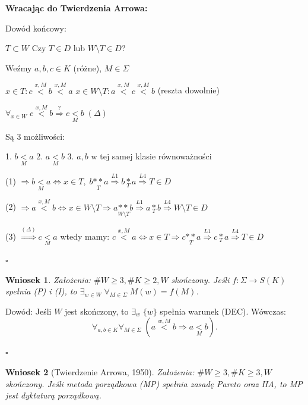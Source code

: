 \documentclass[12pt,a4paper]{article}
\theoremstyle{break}
\newtheorem{wniosek}{Wniosek}[theorem]
\begin{document}
	\textbf{Wracając do Twierdzenia Arrowa:}  
	
	Dowód końcowy:  
	
	$T\subset W$ Czy $T \in D$ lub $W\setminus T \in D$?  
	
	Weźmy $a,b,c\in K$ (różne), $M\in \Sigma$  
	
	$x \in T : c\overset{x,M}{<}b\overset{x,M}{<}a$  
	$x\in W\setminus T : a\overset{x,M}{<}c\overset{x,M}{<}b$ (reszta dowolnie)  
	
	$\forall_{x\in W} \; c\overset{x,M}{<}b \overset{?}{\Rightarrow} c \underset{M}{<}b \; (\Delta)$  
	
	Są 3 możliwości:  
	
	1. $b\underset{M}{<}a$  
	2. $a\underset{M}{<}b$  
	3. $a,b$ w tej samej klasie równoważności  
	
	(1) $\Rightarrow b\underset{M}{<}a \Leftrightarrow x\in T, \; b\underset{T}{**}a \overset{L1}{\Rightarrow} b\underset{T}{*}a \overset{L4}{\Rightarrow} T\in D$  
	
	(2) $\Rightarrow a\overset{x,M}{<}b \Leftrightarrow x\in W\setminus T \Rightarrow a\underset{W\setminus T}{**}b \overset{L1}{\Rightarrow} a\underset{T}{*}b \overset{L4}{\Rightarrow} W\setminus T \in D$  
	
	(3) $\overset{(\Delta)}{\Rightarrow} c\underset{M}{<}a$ wtedy mamy:  
	$c\overset{x,M}{<}a \Leftrightarrow x\in T \Rightarrow c\underset{T}{**}a \overset{L1}{\Rightarrow} c\underset{T}{*}a \overset{L4}{\Rightarrow} T\in D$  
	
	\begin{flushright}
		$\square$
	\end{flushright}
	
	\begin{wniosek}
		Założenia: $\# W \geq 3, \# K \geq 2, W$ skończony.  
		Jeśli $f : \Sigma \to S(K)$ spełnia (P) i (I), to $\exists_{w \in W} \; \forall_{M \in \Sigma} \; M(w) = f(M)$.
	\end{wniosek}
	
	Dowód: Jeśli $W$ jest skończony, to $\exists_w \; \{w\}$ spełnia warunek (DEC).  
	Wówczas:
	\[
	\forall_{a, b \in K} \forall_{M \in \Sigma} \; (a \overset{w, M}{<} b \Rightarrow a \underset{M}{<} b).
	\]
	\begin{flushright}
		$\square$
	\end{flushright}
	
	\begin{wniosek}[Twierdzenie Arrowa, 1950]
		Założenia: $\# W \geq 3, \# K \geq 3, W$ skończony.  
		Jeśli metoda porządkowa (MP) spełnia zasadę Pareto oraz IIA, to MP jest dyktaturą porządkową.
	\end{wniosek}
	
\end{document}
